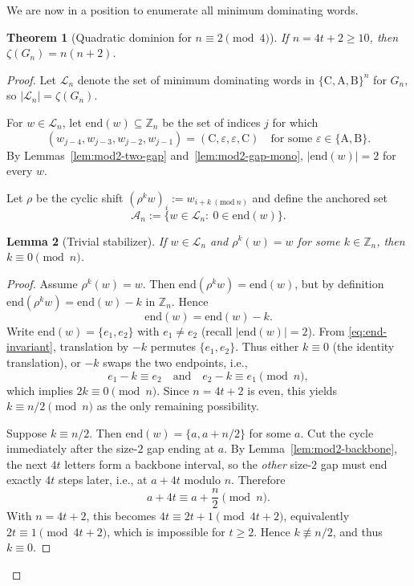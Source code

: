 \documentclass[11pt]{article}
\theoremstyle{plain}
\newtheorem{theorem}{Theorem}[section]
\newtheorem{lemma}[theorem]{Lemma}
\theoremstyle{definition}
\theoremstyle{remark}
\newcommand{\ZZ}{\mathbb{Z}}
\newcommand{\colA}{\mathrm{A}}
\newcommand{\colB}{\mathrm{B}}
\newcommand{\colC}{\mathrm{C}}
\begin{document}
We are now in a position to enumerate all minimum dominating words.

\begin{theorem}[Quadratic dominion for $n\equiv 2\pmod4$]\label{thm:mod2-quadratic}
If $n=4t+2\ge10$, then $\zeta(G_n)=n(n+2)$.
\end{theorem}

\begin{proof}
Let $\mathcal{L}_n$ denote the set of minimum dominating words in
$\{\colC,\colA,\colB\}^n$ for $G_n$, so $|\mathcal{L}_n|=\zeta(G_n)$.

For $w\in\mathcal{L}_n$, let $\mathrm{end}(w)\subseteq\ZZ_n$ be the set of indices $j$
for which
\[
(w_{j-4},w_{j-3},w_{j-2},w_{j-1})
=(\colC,\varepsilon,\varepsilon,\colC)
\quad\text{for some }\varepsilon\in\{\colA,\colB\}.
\]
By Lemmas~\ref{lem:mod2-two-gap} and~\ref{lem:mod2-gap-mono},
$|\mathrm{end}(w)|=2$ for every $w$.

Let $\rho$ be the cyclic shift $(\rho^k w)_i:=w_{i+k\ (\mathrm{mod}\ n)}$ and define the
anchored set
\[
\mathcal{A}_n:=\{w\in\mathcal{L}_n:\ 0\in\mathrm{end}(w)\}.
\]

\begin{lemma}[Trivial stabilizer]\label{lem:trivial-stab}
If $w\in\mathcal{L}_n$ and $\rho^k(w)=w$ for some $k\in\ZZ_n$, then $k\equiv 0\pmod n$.
\end{lemma}

\begin{proof}
Assume $\rho^k(w)=w$. Then $\mathrm{end}(\rho^k w)=\mathrm{end}(w)$, but by definition
$\mathrm{end}(\rho^k w)=\mathrm{end}(w)-k$ in $\ZZ_n$. Hence
\begin{equation}\label{eq:end-invariant}
\mathrm{end}(w)=\mathrm{end}(w)-k.
\end{equation}
Write $\mathrm{end}(w)=\{e_1,e_2\}$ with $e_1\neq e_2$ (recall $|\mathrm{end}(w)|=2$).
From \eqref{eq:end-invariant}, translation by $-k$ permutes $\{e_1,e_2\}$.
Thus either $k\equiv 0$ (the identity translation), or $-k$ swaps the two endpoints, i.e.,
\[
e_1-k\equiv e_2\quad\text{and}\quad e_2-k\equiv e_1 \pmod n,
\]
which implies $2k\equiv 0\pmod n$. Since $n=4t+2$ is even, this yields $k\equiv n/2\pmod n$
as the only remaining possibility.

Suppose $k\equiv n/2$. Then $\mathrm{end}(w)=\{a,a+n/2\}$ for some $a$.
Cut the cycle immediately after the size-$2$ gap ending at $a$.
By Lemma~\ref{lem:mod2-backbone}, the next $4t$ letters form a backbone interval, so the
\emph{other} size-$2$ gap must end exactly $4t$ steps later, i.e., at $a+4t$ modulo $n$.
Therefore
\[
a+4t \equiv a+\frac{n}{2}\pmod n.
\]
With $n=4t+2$, this becomes $4t\equiv 2t+1\pmod{4t+2}$, equivalently $2t\equiv 1\pmod{4t+2}$,
which is impossible for $t\ge 2$. Hence $k\not\equiv n/2$, and thus $k\equiv 0$.
\end{proof}


\end{proof}
\end{document}
